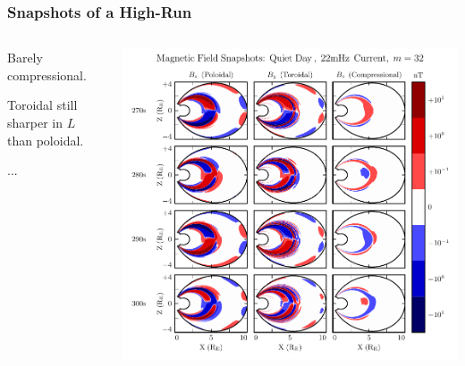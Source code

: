 \documentclass{beamer}
\begin{document}

\begin{frame}
\frametitle{Snapshots of a High-\azm Run}

\begin{columns}
\begin{wideitemize}
\item Barely compressional. 
\item Toroidal still sharper in $L$ than poloidal. 
\item ...
\end{wideitemize}
\includegraphics[width=\textwidth]{figures/snapshot_bigm.pdf}
\end{columns}

\end{frame}

\end{document}
